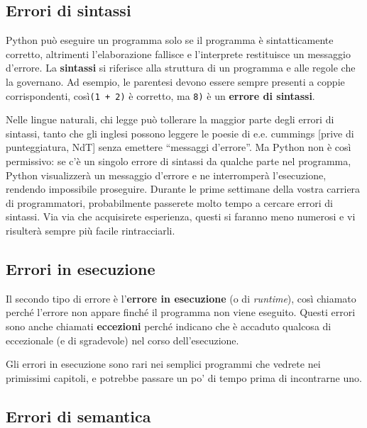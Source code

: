 \documentclass[10pt]{book}
\begin{document}
\subsection{Errori di sintassi}

Python può eseguire un programma solo se il programma è sintatticamente corretto, altrimenti l'elaborazione fallisce e l'interprete restituisce un messaggio d'errore. La {\bf sintassi} si riferisce alla struttura di un programma e alle regole che la governano. Ad esempio, le parentesi devono essere sempre presenti a coppie corrispondenti, così{\tt (1 + 2)} è corretto, ma {\tt 8)} è un {\bf errore di sintassi}.

Nelle lingue naturali, chi legge può tollerare la maggior parte degli errori di sintassi, tanto che gli inglesi possono leggere le poesie di e.e. cummings [prive di punteggiatura, NdT] senza emettere ``messaggi d'errore''. Ma Python non è così permissivo: se c'è un singolo errore di sintassi da qualche parte nel programma, Python visualizzerà un messaggio d'errore e ne interromperà l'esecuzione, rendendo impossibile proseguire. Durante le prime settimane della vostra carriera di programmatori, probabilmente passerete molto tempo a cercare errori di sintassi. Via via che acquisirete esperienza, questi si faranno meno numerosi e vi risulterà sempre più facile rintracciarli.

\subsection{Errori in esecuzione}
\label{runtime}

Il secondo tipo di errore è l'{\bf errore in esecuzione} (o di {\em runtime}), così chiamato perché l'errore non appare finché il programma non viene eseguito. Questi errori sono anche chiamati {\bf eccezioni} perché indicano che è accaduto qualcosa di eccezionale (e di sgradevole) nel corso dell'esecuzione.

Gli errori in esecuzione sono rari nei semplici programmi che vedrete nei primissimi capitoli, e potrebbe passare un po' di tempo prima di incontrarne uno.


\subsection{Errori di semantica}
\end{document}
